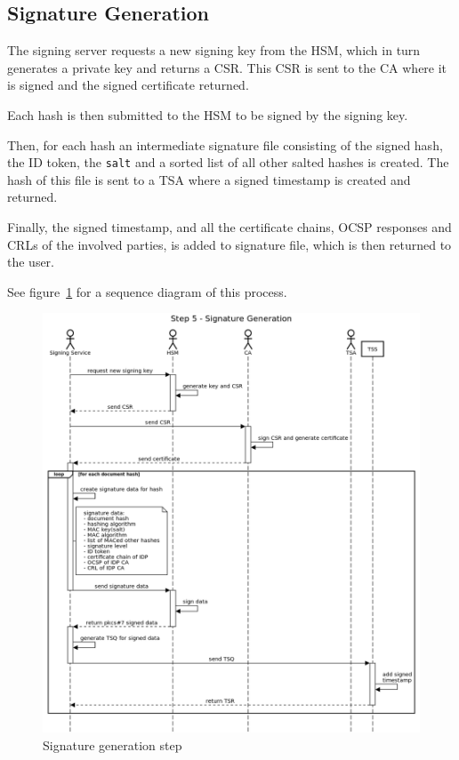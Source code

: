 \subsection{Signature Generation}\label{subsec:signature-generation}
The signing server requests a new signing key from the \gls{HSM}, which in turn generates a private key and returns a \gls{CSR}.
This \gls{CSR} is sent to the \gls{CA} where it is signed and the signed certificate returned.

Each hash is then submitted to the \gls{HSM} to be signed by the signing key.

Then, for each hash an intermediate signature file consisting of the signed hash,
the ID token, the \texttt{salt} and a sorted list of all other salted hashes is created.
The hash of this file is sent to a \gls{TSA} where a signed timestamp is created and returned.

Finally, the signed timestamp, and all the certificate chains,
\gls{OCSP} responses and \gls{CRL}s of the involved parties,
is added to signature file, which is then returned to the user.

See figure~\ref{fig:signaturegenerationstep} for a sequence diagram of this process.

\begin{figure}
	\begin{center}
		\includegraphics[scale=0.45]{images/protocol_step5_signature_generation.png}
		\caption{Signature generation step}
		\label{fig:signaturegenerationstep}
	\end{center}
\end{figure}

